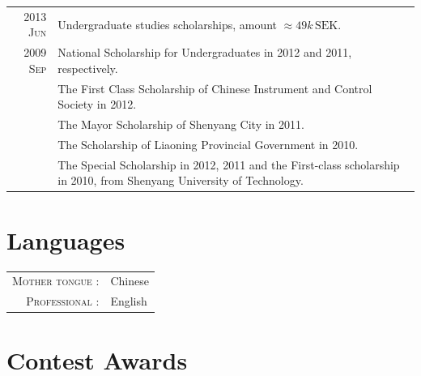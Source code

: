 \documentclass[a4paper,10pt]{article}
\begin{document}
\begin{savenotes}
\begin{longtable}{r|p{13cm}}
    \textsc{2013 Jun}	& Undergraduate studies scholarships, amount $\approx 49k\,\mathrm {SEK}$.\\
    \textsc{2009 Sep} & National Scholarship for Undergraduates in 2012 and 2011, respectively.\\
                      & The First Class Scholarship of Chinese Instrument and Control Society in 2012.\\
                      & The Mayor Scholarship of Shenyang City in 2011.\\
                      & The Scholarship of Liaoning Provincial Government in 2010.\\
                      & The Special Scholarship in 2012, 2011 and the First-class scholarship in 2010, from Shenyang University of Technology.\\
  \end{longtable}
\end{savenotes}



\section{Languages}

\begin{tabular}{rp{10cm}}

  \textsc{Mother tongue :} & Chinese \\

  \textsc{Professional :} & English \\

\end{tabular}



\section{Contest Awards}
\end{document}
